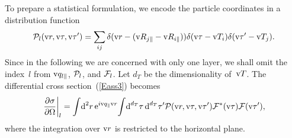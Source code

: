 To prepare a statistical formulation,
we encode the particle coordinates in a distribution function
%
%
%
\begin{equation}\label{EPDdeltas}
  \mathcal{P}_{l}(\text{v}{r},\text{v}\tau,\text{v}\tau')
  = \sum_{ij} \delta(\text{v}{r}-(\text{v}{R}_{j\parallel}-\text{v}{R}_{i\parallel}))
  \delta(\text{v}\tau-\text{v}{T}_i)\delta(\text{v}\tau'-\text{v}{T}_j).
\end{equation}
Since in the following we are concerned with only one layer,
we shall omit the index~$l$ from $\text{v}{q}_{l\parallel}$, $\mathcal{P}_l$, and $\mathcal{F}_l$.
Let $d_T$ be the dimensionality of~$\text{v}{T}$.
The differential cross section~(\ref{Eass3}) becomes
\begin{equation}\label{Epdm1}
  \left.\frac{\partial\sigma}{\partial\Omega}\right|_l
  =
  \int\!\text{d}^2r\,   \text{e}^{i\text{v}{q}_{\parallel}\text{v}{r}}\!
  \int\! \text{d}^{d_T}\tau\, \text{d}^{d_T}\tau'
    \mathcal{P}(\text{v}{r},\text{v}\tau,\text{v}\tau')
    \mathcal{F}^*(\text{v}\tau) \mathcal{F}(\text{v}\tau'),
\end{equation}
where the integration over $\text{v}{r}$ is restricted to the horizontal plane.

